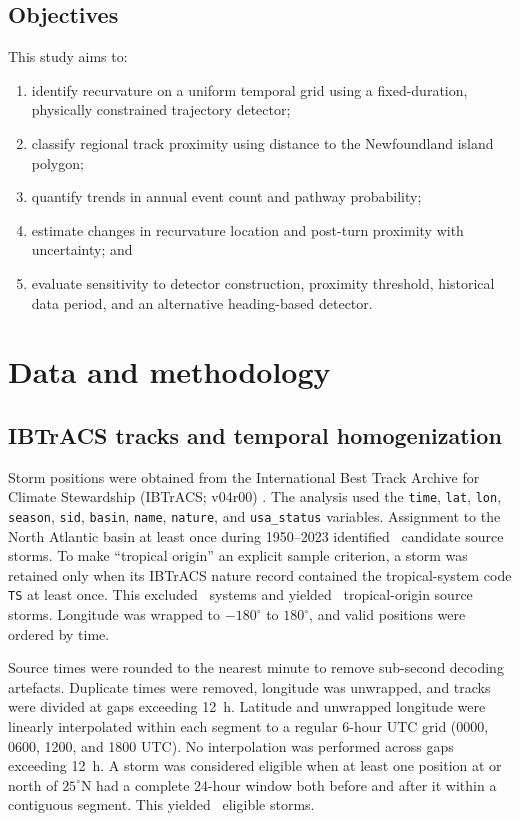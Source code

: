 \documentclass[11pt]{article}
\begin{document}
\subsection{Objectives}
This study aims to:
\begin{enumerate}
    \item identify recurvature on a uniform temporal grid using a fixed-duration, physically constrained trajectory detector;
    \item classify regional track proximity using distance to the Newfoundland island polygon;
    \item quantify trends in annual event count and pathway probability;
    \item estimate changes in recurvature location and post-turn proximity with uncertainty; and
    \item evaluate sensitivity to detector construction, proximity threshold, historical data period, and an alternative heading-based detector.
\end{enumerate}

\section{Data and methodology}

\subsection{IBTrACS tracks and temporal homogenization}
Storm positions were obtained from the International Best Track Archive for Climate Stewardship (IBTrACS; v04r00) \citep{Knapp2010,Gahtan2024}. The analysis used the \texttt{time}, \texttt{lat}, \texttt{lon}, \texttt{season}, \texttt{sid}, \texttt{basin}, \texttt{name}, \texttt{nature}, and \texttt{usa\_status} variables. Assignment to the North Atlantic basin at least once during 1950--2023 identified \NorthAtlanticSourceN\ candidate source storms. To make ``tropical origin'' an explicit sample criterion, a storm was retained only when its IBTrACS nature record contained the tropical-system code \texttt{TS} at least once. This excluded \NonTropicalExcludedN\ systems and yielded \TropicalOriginSourceN\ tropical-origin source storms. Longitude was wrapped to \(-180^\circ\) to \(180^\circ\), and valid positions were ordered by time.

Source times were rounded to the nearest minute to remove sub-second decoding artefacts. Duplicate times were removed, longitude was unwrapped, and tracks were divided at gaps exceeding 12~h. Latitude and unwrapped longitude were linearly interpolated within each segment to a regular 6-hour UTC grid (0000, 0600, 1200, and 1800 UTC). No interpolation was performed across gaps exceeding 12~h. A storm was considered eligible when at least one position at or north of \(25^\circ\)N had a complete 24-hour window both before and after it within a contiguous segment. This yielded \EligibleN\ eligible storms.
\end{document}
